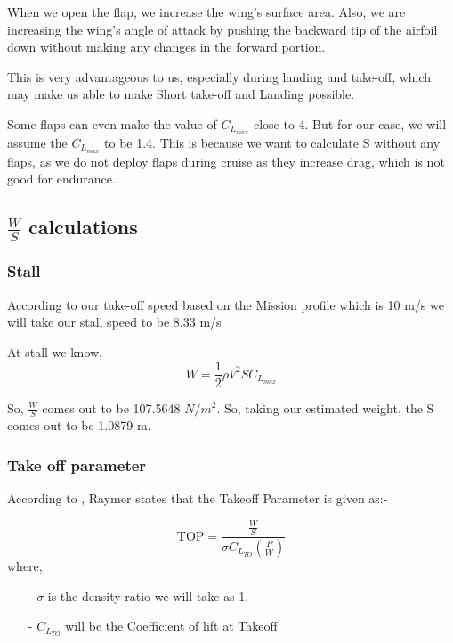 \documentclass[12 pt]{article}
\begin{document}
When we open the flap, we increase the wing's surface area. Also, we are increasing the wing's angle of attack by pushing the backward tip of the airfoil down without making any changes in the forward portion.

This is very advantageous to us, especially during landing and take-off, which may make us able to make Short take-off and Landing possible. 

Some flaps can even make the value of $C_{L_{max}}$ close to 4. But for our case, we will assume the $C_{L_{max}}$ to be 1.4. This is because we want to calculate S without any flaps, as we do not deploy flaps during cruise as they increase drag, which is not good for endurance.

\subsection{ $\frac{W}{S}$ calculations }

\subsubsection{Stall}

According to our take-off speed based on the Mission profile which is 10 m/s we will take our stall speed to be 8.33 m/s

At stall we know,
$$W = \frac{1}{2} \rho V^2 S C_{L_{max}} $$

So, $\frac{W}{S}$ comes out to be 107.5648 $N/m^2$. So, taking our estimated weight, the S comes out to be 1.0879 m.


\subsubsection{Take off parameter}

According to \cite{Raymer.2006}, Raymer states that the Takeoff Parameter is given as:- 

$$\text{TOP} = \frac{\frac{W}{S}}{ \sigma C_{L_{TO}} \left( \frac{P}{W} \right) }$$
where,
\begin{itemize}
    \item[-] $\sigma$ is the density ratio we will take as 1.
    \item [-] $C_{L_{TO}}$ will be the Coefficient of lift at Takeoff 
\end{itemize}
\end{document}
